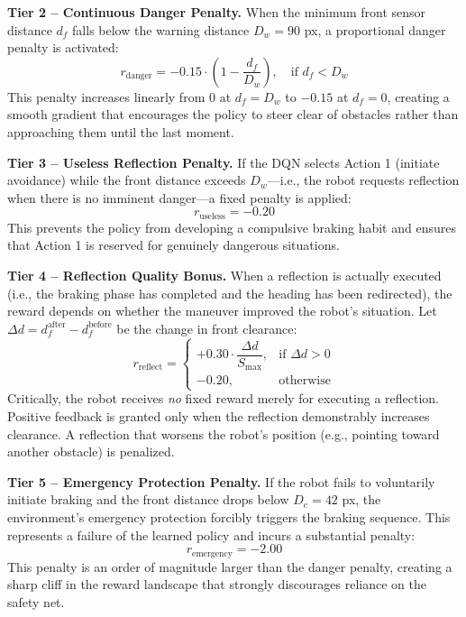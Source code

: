 \documentclass[conference]{IEEEtran}
\begin{document}
\textbf{Tier 2 -- Continuous Danger Penalty.} When the minimum front sensor distance $d_f$ falls below the warning distance $D_w = 90$ px, a proportional danger penalty is activated:
\begin{equation}
    r_{\text{danger}} = -0.15 \cdot \left(1 - \frac{d_f}{D_w}\right), \quad \text{if } d_f < D_w
\end{equation}
This penalty increases linearly from $0$ at $d_f = D_w$ to $-0.15$ at $d_f = 0$, creating a smooth gradient that encourages the policy to steer clear of obstacles rather than approaching them until the last moment.

\textbf{Tier 3 -- Useless Reflection Penalty.} If the DQN selects Action 1 (initiate avoidance) while the front distance exceeds $D_w$---i.e., the robot requests reflection when there is no imminent danger---a fixed penalty is applied:
\begin{equation}
    r_{\text{useless}} = -0.20
\end{equation}
This prevents the policy from developing a compulsive braking habit and ensures that Action 1 is reserved for genuinely dangerous situations.

\textbf{Tier 4 -- Reflection Quality Bonus.} When a reflection is actually executed (i.e., the braking phase has completed and the heading has been redirected), the reward depends on whether the maneuver improved the robot's situation. Let $\Delta d = d_f^{\text{after}} - d_f^{\text{before}}$ be the change in front clearance:
\begin{equation}
    r_{\text{reflect}} =
    \begin{cases}
        +0.30 \cdot \dfrac{\Delta d}{S_{\text{max}}}, & \text{if } \Delta d > 0 \\[8pt]
        -0.20, & \text{otherwise}
    \end{cases}
\end{equation}
Critically, the robot receives \emph{no} fixed reward merely for executing a reflection. Positive feedback is granted only when the reflection demonstrably increases clearance. A reflection that worsens the robot's position (e.g., pointing toward another obstacle) is penalized.

\textbf{Tier 5 -- Emergency Protection Penalty.} If the robot fails to voluntarily initiate braking and the front distance drops below $D_e = 42$ px, the environment's emergency protection forcibly triggers the braking sequence. This represents a failure of the learned policy and incurs a substantial penalty:
\begin{equation}
    r_{\text{emergency}} = -2.00
\end{equation}
This penalty is an order of magnitude larger than the danger penalty, creating a sharp cliff in the reward landscape that strongly discourages reliance on the safety net.
\end{document}
